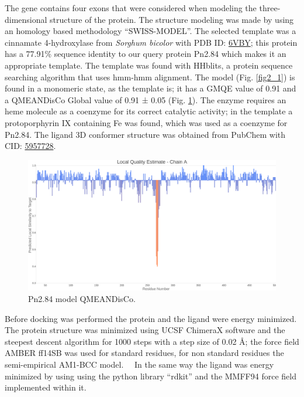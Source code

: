 \documentclass[12pt]{article}
\begin{document}
	The gene contains four exons that were considered when modeling the three-dimensional structure of the protein. The structure modeling was made by using an homology based methodology ``SWISS-MODEL''. \cite{swiss} The selected template was a cinnamate 4-hydroxylase from \textit{Sorghum bicolor} with PDB ID: \href{https://www.rcsb.org/structure/6VBY}{6VBY}; this protein has a 77.91\% sequence identity to our query protein Pn2.84 which makes it an appropriate template. The template was found with HHblits, a protein sequence searching algorithm that uses hmm-hmm alignment. \cite{hhblits} The model (Fig. \ref{fig2_1}) is found in a monomeric state, as the template is; it has a GMQE value of 0.91 and a QMEANDisCo Global value of 0.91 ± 0.05 (Fig. \ref{fig2_2}). \cite{qmeandisco_swiss} The enzyme requires an heme molecule as a coenzyme for its correct catalytic activity; in the template a protoporphyrin IX containing Fe was found, which was used as a coenzyme for Pn2.84. The ligand 3D conformer structure was obtained from PubChem with CID: \href{https://pubchem.ncbi.nlm.nih.gov/compound/5957728}{5957728}.
	
	
	\FloatBarrier
	\begin{figure}[h!]
		\centering
		\includegraphics[width=\textwidth-50pt]{../2/Swiss/Local_quality_estimate.png}
		\caption{\centering Pn2.84 model QMEANDisCo.}
		\label{fig2_2}
	\end{figure}
	\FloatBarrier
	
	Before docking was performed the protein and the ligand were energy minimized. The protein structure was minimized using UCSF ChimeraX software \cite{chimera,chimera_2} and the steepest descent algorithm for 1000 steps with a step size of 0.02 \r{A}; the force field AMBER ff14SB was used for standard residues, for non standard residues the semi-empirical AM1-BCC model. \cite{am1_bcc,am1_bcc_2,am1_bcc_3}\ \ In the same way the ligand was energy minimized by using using the python library ``rdkit'' and the MMFF94 force field implemented within it. \cite{rdkit,rdkit_mmff}
	
\end{document}
